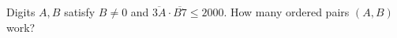 Digits $A,B$ satisfy $B\ne0$ and $\overline{3A}\cdot\overline{B7}\le2000$. How many ordered pairs $(A,B)$ work?

